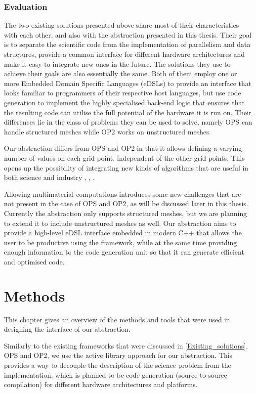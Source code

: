 \documentclass[fontsize=11pt, appendixprefix=true]{scrreprt}
\begin{document}
\subsection{Evaluation}

The two existing solutions presented above share most of their characteristics
with each other, and also with the abstraction presented in this thesis. Their
goal is to separate the scientific code from the implementation of parallelism
and data structures, provide a common interface for different hardware
architectures and make it easy to integrate new ones in the future. The
solutions they use to achieve their goals are also essentially the same. Both of
them employ one or more Embedded Domain Specific Languages (eDSLs) to provide an
interface that looks familiar to programmers of their respective host languages,
but use code generation to implement the highly specialised back-end logic that
ensures that the resulting code can utilise the full potential of the hardware
it is run on. Their differences lie in the class of problems they can be used to
solve, namely OPS can handle structured meshes while OP2 works on unstructured
meshes.

Our abstraction differs from OPS and OP2 in that it allows defining a varying
number of values on each grid point, independent of the other grid points. This
opens up the possibility of integrating new kinds of algorithms that are useful
in both science and industry \cite{Explosive}, \cite{Pultrusion},
\cite{Multimat_Lagrangian}.

Allowing multimaterial computations introduces some new challenges that are not
present in the case of OPS and OP2, as will be discussed later in this
thesis. Currently the abstraction only supports structured meshes, but we are
planning to extend it to include unstructured meshes as well. Our abstraction
aims to provide a high-level eDSL interface embedded in modern C++ that allows
the user to be productive using the framework, while at the same time providing
enough information to the code generation unit so that it can generate efficient
and optimised code.

\chapter{Methods}

This chapter gives an overview of the methods and tools that were used in
designing the interface of our abstraction.

Similarly to the existing frameworks that were discussed in
\autoref{Existing_solutions}, OPS and OP2, we use the active library approach
for our abstraction. This provides a way to decouple the description of the
science problem from the implementation, which is planned to be code generation
(source-to-source compilation) for different hardware architectures and
platforms.
\end{document}
